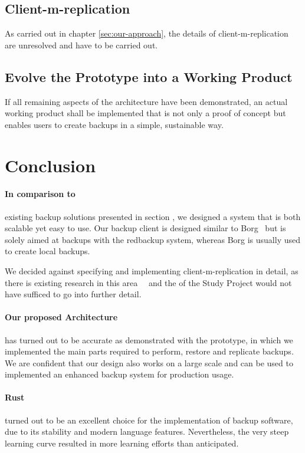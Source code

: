 \subsection{Client-m-replication}
As carried out in chapter \ref{sec:our-approach}, the details of \gls{client-m-replication} are unresolved and have to be carried out.

\subsection{Evolve the Prototype into a Working Product}
If all remaining aspects of the architecture have been demonstrated, an actual working product shall be implemented that is not only a proof of concept but enables users to create backups in a simple, sustainable way.

\section{Conclusion}
\paragraph{In comparison to}
existing backup solutions presented in section , we designed a system that is both scalable yet easy to use. Our backup \gls{client} is designed similar to Borg~\cite{borg-backup} but is solely aimed at backups with the redbackup system, whereas Borg is usually used to create local backups.

We decided against specifying and implementing \gls{client-m-replication} in detail, as there is existing research in this area~\cite{p2p-redundancy}~\cite{p2p-scheduling} and the  of the Study Project would not have sufficed to go into further detail.

\paragraph{Our proposed Architecture}
has turned out to be accurate as demonstrated with the prototype, in which we implemented the main parts required to perform, restore and replicate backups. We are confident that our design also works on a large scale and can be used to implemented an enhanced backup system for production usage.

\paragraph{Rust}
turned out to be an excellent choice for the implementation of backup software, due to its stability and modern language features.
Nevertheless, the very steep learning curve resulted in more learning efforts than anticipated.

